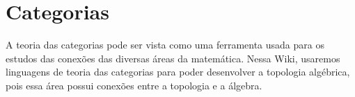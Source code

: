 \section{Categorias}
\label{categorias}

A teoria das categorias pode ser vista como uma ferramenta usada para os estudos das conexões das diversas áreas da matemática. Nessa Wiki, usaremos linguagens de teoria das categorias para poder desenvolver a topologia algébrica, pois essa área possui conexões entre a topologia e a álgebra.

 










